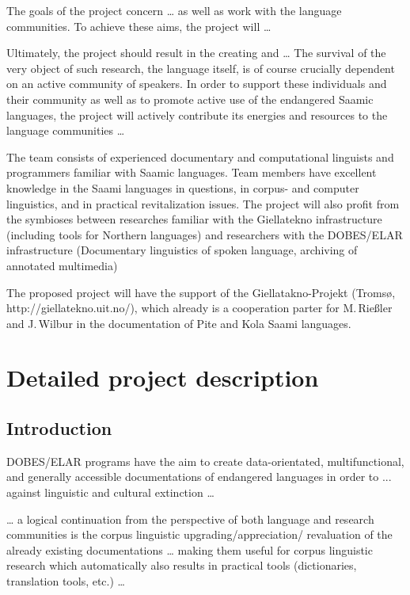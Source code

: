 \documentclass[a4paper,12pt]{article}
\begin{document}
The goals of the project concern … as well as work with the language communities. To achieve these aims, the project will …

Ultimately, the project should result in the creating and … The survival of the very object of such research, the language itself, is of course crucially dependent on an active community of speakers. In order to support these individuals and their community as well as to promote active use of the endangered Saamic languages, the project will actively contribute its energies and resources to the language communities …

The team consists of experienced documentary and computational linguists and programmers familiar with Saamic languages. Team members have excellent knowledge in the Saami languages in questions, in corpus- and computer linguistics, and in practical revitalization issues. The project will also profit from the symbioses between researches familiar with the Giellatekno infrastructure (including tools for Northern languages) and researchers with the DOBES/ELAR infrastructure (Documentary linguistics of spoken language, archiving of annotated multimedia)

The proposed project will have the support of the {Giellatakno-Projekt} (Tromsø, http://giellatekno.uit.no/), which already is a cooperation parter for M.\,Rießler and J.\,Wilbur in the documentation of Pite and Kola Saami languages. 

\section{Detailed project description}%
\subsection{Introduction}

DOBES/ELAR programs have the aim to create data-orientated, multifunctional, and generally accessible documentations of endangered languages in order to ... against linguistic and cultural extinction … 
 
… a logical continuation from the perspective of both language and research communities is the corpus linguistic upgrading/appreciation/
revaluation of the already existing documentations … making them useful for corpus linguistic research which automatically also results in practical tools (dictionaries, translation tools, etc.) …
\end{document}
